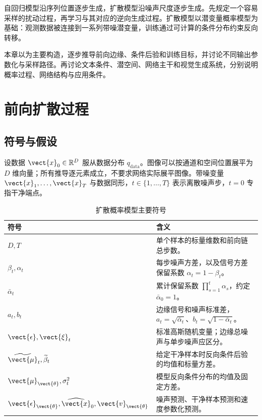 \documentclass[../textbook.tex]{subfiles}
\begin{document}
\fi
{}

自回归模型沿序列位置逐步生成，扩散模型沿噪声尺度逐步生成。先规定一个容易采样的扰动过程，再学习与其对应的逆向生成过程。扩散模型以潜变量概率模型为基础：观测数据被连接到一系列带噪潜变量，训练通过可计算的条件分布约束反向转移。

本章以为主要构造\cite{ho2020ddpm}，逐步推导前向边缘、条件后验和训练目标，并讨论不同输出参数化与采样路径。再讨论文本条件、潜空间、网络主干和视觉生成系统，分别说明概率过程、网络结构与应用条件。

\section{前向扩散过程}

\subsection{符号与假设}
设数据 $\vect{x}_0\in\mathbb R^D$ 服从数据分布 $q_{\mathrm{data}}$。图像可以按通道和空间位置展平为 $D$ 维向量；所有推导逐元素成立，不要求网络实际展平图像。带噪变量 $\vect{x}_1,\ldots,\vect{x}_T$ 与数据同形，$t\in\{1,\ldots,T\}$ 表示离散噪声步，$t=0$ 专指干净端点。

\begin{table}[htbp]
\centering
\caption{扩散概率模型主要符号}\label{tab:diffusion-symbols}
\begin{tabular}{ll}
\toprule 符号 & 含义\\
\midrule
$D,T$ & 单个样本的标量维数和前向链总步数。\\
$\beta_t,\alpha_t$ & 每步噪声方差，以及信号方差保留系数 $\alpha_t=1-\beta_t$。\\
$\bar\alpha_t$ & 累计保留系数 $\prod_{s=1}^t\alpha_s$，约定 $\bar\alpha_0=1$。\\
$a_t,b_t$ & 边缘信号和噪声标准差，$a_t=\sqrt{\bar\alpha_t}$、$b_t=\sqrt{1-\bar\alpha_t}$。\\
$\vect{\epsilon},\vect{\xi}_t$ & 标准高斯随机变量；边缘总噪声与单步噪声应区分。\\
$\widetilde{\vect{\mu}}_t,\widetilde\beta_t$ & 给定干净样本时反向条件后验的均值和标量方差。\\
$\vect{\mu}_{\vect{\theta}},\sigma_t^2$ & 模型反向条件分布的均值及固定方差。\\
$\vect{\epsilon}_{\vect{\theta}},\widehat{\vect{x}}_0,\vect{v}_{\vect{\theta}}$ & 噪声预测、干净样本预测和速度参数化预测。\\
\bottomrule
\end{tabular}
\end{table}
\end{document}

